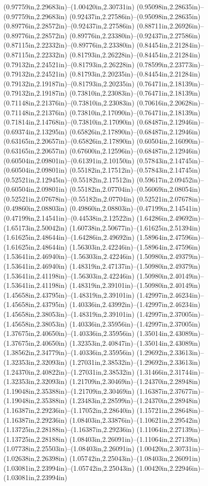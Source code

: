 (0.97759in,2.29683in)--(1.00420in,2.30731in) (0.95098in,2.28635in)--(0.97759in,2.29683in) (0.92437in,2.27586in)--(0.95098in,2.28635in) (0.89776in,2.28572in)--(0.92437in,2.27586in) (0.88711in,2.26926in)--(0.89776in,2.28572in) (0.89776in,2.23380in)--(0.92437in,2.27586in) (0.87115in,2.22332in)--(0.89776in,2.23380in) (0.84454in,2.21284in)--(0.87115in,2.22332in) (0.81793in,2.26228in)--(0.84454in,2.21284in) (0.79132in,2.24521in)--(0.81793in,2.26228in) (0.78599in,2.23773in)--(0.79132in,2.24521in) (0.81793in,2.20235in)--(0.84454in,2.21284in) (0.79132in,2.19187in)--(0.81793in,2.20235in) (0.76471in,2.18139in)--(0.79132in,2.19187in) (0.73810in,2.23083in)--(0.76471in,2.18139in) (0.71148in,2.21376in)--(0.73810in,2.23083in) (0.70616in,2.20628in)--(0.71148in,2.21376in) (0.73810in,2.17090in)--(0.76471in,2.18139in) (0.71814in,2.14768in)--(0.73810in,2.17090in) (0.68487in,2.12946in)--(0.69374in,2.13295in) (0.65826in,2.17890in)--(0.68487in,2.12946in) (0.63165in,2.20657in)--(0.65826in,2.17890in) (0.60504in,2.16090in)--(0.63165in,2.20657in) (0.67600in,2.12596in)--(0.68487in,2.12946in) (0.60504in,2.09801in)--(0.61391in,2.10150in) (0.57843in,2.14745in)--(0.60504in,2.09801in) (0.55182in,2.17512in)--(0.57843in,2.14745in) (0.52521in,2.12945in)--(0.55182in,2.17512in) (0.59617in,2.09452in)--(0.60504in,2.09801in) (0.55182in,2.07704in)--(0.56069in,2.08054in) (0.52521in,2.07678in)--(0.55182in,2.07704in) (0.52521in,2.07678in)--(0.49860in,2.08803in) (0.49860in,2.08803in)--(0.47199in,2.14541in) (0.47199in,2.14541in)--(0.44538in,2.12522in) (1.64286in,2.49692in)--(1.65173in,2.50042in) (1.60738in,2.50677in)--(1.61625in,2.51394in) (1.61625in,2.48644in)--(1.64286in,2.49692in) (1.58964in,2.47596in)--(1.61625in,2.48644in) (1.56303in,2.42246in)--(1.58964in,2.47596in) (1.53641in,2.46940in)--(1.56303in,2.42246in) (1.50980in,2.49379in)--(1.53641in,2.46940in) (1.48319in,2.47137in)--(1.50980in,2.49379in) (1.53641in,2.41198in)--(1.56303in,2.42246in) (1.50980in,2.40149in)--(1.53641in,2.41198in) (1.48319in,2.39101in)--(1.50980in,2.40149in) (1.45658in,2.43795in)--(1.48319in,2.39101in) (1.42997in,2.46234in)--(1.45658in,2.43795in) (1.40336in,2.43992in)--(1.42997in,2.46234in) (1.45658in,2.38053in)--(1.48319in,2.39101in) (1.42997in,2.37005in)--(1.45658in,2.38053in) (1.40336in,2.35956in)--(1.42997in,2.37005in) (1.37675in,2.40650in)--(1.40336in,2.35956in) (1.35014in,2.43089in)--(1.37675in,2.40650in) (1.32353in,2.40847in)--(1.35014in,2.43089in) (1.38562in,2.34779in)--(1.40336in,2.35956in) (1.29692in,2.33613in)--(1.32353in,2.32093in) (1.27031in,2.38532in)--(1.29692in,2.33613in) (1.24370in,2.40822in)--(1.27031in,2.38532in) (1.31466in,2.31744in)--(1.32353in,2.32093in) (1.21709in,2.30469in)--(1.24370in,2.28948in) (1.19048in,2.35388in)--(1.21709in,2.30469in) (1.16387in,2.37677in)--(1.19048in,2.35388in) (1.23483in,2.28599in)--(1.24370in,2.28948in) (1.16387in,2.29236in)--(1.17052in,2.28640in) (1.15721in,2.28648in)--(1.16387in,2.29236in) (1.08403in,2.33876in)--(1.10621in,2.29542in) (1.13725in,2.28188in)--(1.16387in,2.29236in) (1.11064in,2.27139in)--(1.13725in,2.28188in) (1.08403in,2.26091in)--(1.11064in,2.27139in) (1.07738in,2.25503in)--(1.08403in,2.26091in) (1.00420in,2.30731in)--(1.02638in,2.26398in) (1.05742in,2.25043in)--(1.08403in,2.26091in) (1.03081in,2.23994in)--(1.05742in,2.25043in) (1.00420in,2.22946in)--(1.03081in,2.23994in) 